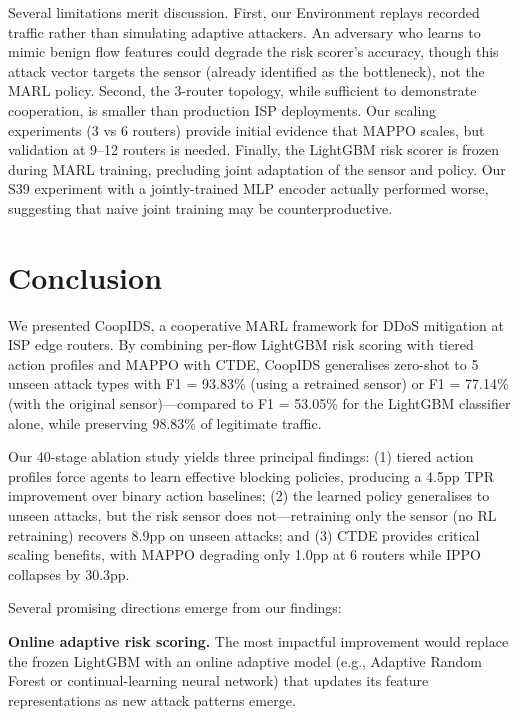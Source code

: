 \documentclass[sigconf,nonacm]{acmart}
\begin{document}
Several limitations merit discussion. First, our Environment replays recorded traffic rather than simulating adaptive attackers. An adversary who learns to mimic benign flow features could degrade the risk scorer's accuracy, though this attack vector targets the sensor (already identified as the bottleneck), not the MARL policy. Second, the 3-router topology, while sufficient to demonstrate cooperation, is smaller than production ISP deployments. Our scaling experiments (3 vs 6 routers) provide initial evidence that MAPPO scales, but validation at 9--12 routers is needed. Finally, the LightGBM risk scorer is frozen during MARL training, precluding joint adaptation of the sensor and policy. Our S39 experiment with a jointly-trained MLP encoder actually performed worse, suggesting that naive joint training may be counterproductive.


\section{Conclusion}
\label{sec:conclusion}

We presented CoopIDS, a cooperative MARL framework for DDoS mitigation at ISP edge routers. By combining per-flow LightGBM risk scoring with tiered action profiles and MAPPO with CTDE, CoopIDS generalises zero-shot to 5 unseen attack types with F1 = 93.83\% (using a retrained sensor) or F1 = 77.14\% (with the original sensor)---compared to F1 = 53.05\% for the LightGBM classifier alone, while preserving 98.83\% of legitimate traffic.

Our 40-stage ablation study yields three principal findings: (1) tiered action profiles force agents to learn effective blocking policies, producing a 4.5pp TPR improvement over binary action baselines; (2) the learned policy generalises to unseen attacks, but the risk sensor does not---retraining only the sensor (no RL retraining) recovers 8.9pp on unseen attacks; and (3) CTDE provides critical scaling benefits, with MAPPO degrading only 1.0pp at 6 routers while IPPO collapses by 30.3pp.

Several promising directions emerge from our findings:

\textbf{Online adaptive risk scoring.} The most impactful improvement would replace the frozen LightGBM with an online adaptive model (e.g., Adaptive Random Forest or continual-learning neural network) that updates its feature representations as new attack patterns emerge.
\end{document}
